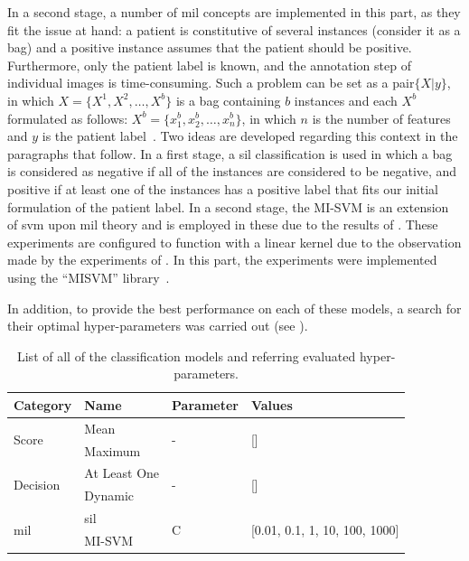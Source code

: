 \documentclass[journal,article,accept,moreauthors,pdftex, applsci]{Definitions/mdpi}
\begin{document}
In a second stage, a number of \ac{mil} concepts are implemented in this part, as they fit the issue at hand: a patient is constitutive of several instances (consider it as a bag) and a positive instance assumes that the patient should be positive. Furthermore, only the patient label is known, and the annotation step of individual images is time-consuming. Such a problem can be set as a pair\(\{X|y\}\), in which \(X=\{X^1,X^2,\ldots,X^b\}\) is a bag containing \(b\) instances and each \(X^b\) formulated as follows: \(X^b=\{x^b_1,x^b_2,\ldots,x^b_n\}\), in which \(n\) is the number of features and \(y\) is the patient label~\cite{foulds_frank_2010}. Two ideas are developed regarding this context in the paragraphs that follow. In a first stage, a \ac{sil} classification is used in which a bag is considered as negative if all of the instances are considered to be negative, and positive if at least one of the instances has a positive label that fits our initial formulation of the patient label. In a second stage, the MI-SVM is an extension of \ac{svm} upon \ac{mil} theory and is employed in these due to the results of . These experiments are configured to function with a linear kernel due to the observation made by the experiments of . In this part, the experiments were implemented using the “MISVM” library~\cite{Doran2014}.\par
In addition, to provide the best performance on each of these models, a search for their optimal hyper-parameters was carried out (see ).\par
\begin{table}[H]
    \centering
    \begin{tabular}{llll}
    \textbf{Category}               & \textbf{Name}     & \textbf{Parameter}& \textbf{Values}                                   \\ \hline
    \multirow{2}{*}{Score}          & Mean              & \multirow{2}{*}{-}& \multirow{2}{*}{[]}                               \\ \cline{2-2}
                                    & Maximum           &                   &                                                   \\ \hline 
    \multirow{2}{*}{Decision}       & At Least One      & \multirow{2}{*}{-}& \multirow{2}{*}{[]}                               \\ \cline{2-2}
                                    & Dynamic           &                   &                                                   \\ \hline 
    \multirow{2}{*}{\ac{mil}}       & \ac{sil}          & \multirow{2}{*}{C}& \multirow{2}{*}{[0.01, 0.1, 1, 10, 100, 1000]}    \\ \cline{2-2}
                                    & MI-SVM            &                   &                                                   \\ \hline 
    \end{tabular}    
    \caption{List of all of the classification models and referring evaluated hyper-parameters.}
    \label{tab:patient_hyperparameters}
\end{table}\par
\end{document}

